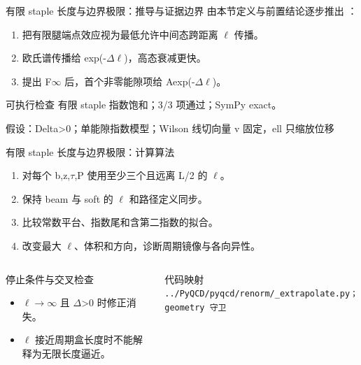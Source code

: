 \begin{frame}[t]{有限 staple 长度与边界极限：推导与证据边界}
\footnotesize
{}\quad 由本节定义与前置结论逐步推出 ：
\begin{enumerate}
\item 把有限腿端点效应视为最低允许中间态跨距离 \ensuremath{\ell} 传播。
\item 欧氏谱传播给 exp(-\ensuremath{\Delta}\ensuremath{\ell})，高态衰减更快。
\item 提出 F\ensuremath{\infty} 后，首个非零能隙项给 Aexp(-\ensuremath{\Delta}\ensuremath{\ell})。
\end{enumerate}\begin{block}{可执行检查}
\quad 有限 staple 指数饱和；3/3 项通过；SymPy exact。
\par\scriptsize 假设：Delta>0；单能隙指数模型；Wilson 线切向量 v 固定，ell 只缩放位移
\end{block}
\end{frame}

\begin{frame}[t]{有限 staple 长度与边界极限：计算算法}
\footnotesize
{}\begin{enumerate}
\item 对每个 b,z,\ensuremath{\tau},P 使用至少三个且远离 L/\allowbreak{}2 的 \ensuremath{\ell}。
\item 保持 beam 与 soft 的 \ensuremath{\ell} 和路径定义同步。
\item 比较常数平台、指数尾和含第二指数的拟合。
\item 改变最大 \ensuremath{\ell}、体积和方向，诊断周期镜像与各向异性。
\end{enumerate}\begin{columns}[T,onlytextwidth]
\begin{block}{停止条件与交叉检查}\scriptsize\begin{itemize}
\item[\CheckMark] \ensuremath{\ell}\ensuremath{\rightarrow}\ensuremath{\infty} 且 \ensuremath{\Delta}>0 时修正消失。
\item[\CheckMark] \ensuremath{\ell} 接近周期盒长度时不能解释为无限长度逼近。
\end{itemize}\end{block}
\begin{block}{代码映射}
\scriptsize \texttt{.\allowbreak{}.\allowbreak{}/\allowbreak{}PyQCD/\allowbreak{}pyqcd/\allowbreak{}renorm/\allowbreak{}\_\allowbreak{}extrapolate.\allowbreak{}py；geometry 守卫}
\end{block}\end{columns}\end{frame}

